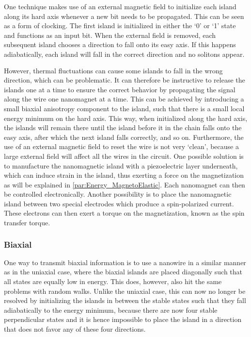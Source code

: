 \documentclass[12pt,a4paper]{article}
\begin{document}
One technique makes use of an external magnetic field to initialize each island along its hard axis whenever a new bit needs to be propagated. This can be seen as a form of clocking. The first island is initialized in either the `0' or `1' state and functions as an input bit. %
When the external field is removed, each subsequent island chooses a direction to fall onto its easy axis. If this happens adiabatically, each island will fall in the correct direction and no solitons appear.~\cite{NML_Carlton} \par
However, thermal fluctuations can cause some islands to fall in the wrong direction, which can be problematic. It can therefore be instructive to release the islands one at a time to ensure the correct behavior by propagating the signal along the wire one nanomagnet at a time. This can be achieved by introducing a small biaxial anisotropy component to the island, such that there is a small local energy minimum on the hard axis. This way, when initialized along the hard axis, the islands will remain there until the island before it in the chain falls onto the easy axis, after which the next island falls correctly, and so on. Furthermore, the use of an external magnetic field to reset the wire is not very `clean', because a large external field will affect all the wires in the circuit. One possible solution is to manufacture the nanomagnetic island with a piezoelectric layer underneath, which can induce strain in the island, thus exerting a force on the magnetization as will be explained in \cref{par:Energy_MagnetoElastic}. Each nanomagnet can then be controlled electronically. Another possibility is to place the nanomagnetic island between two special electrodes which produce a spin-polarized current. These electrons can then exert a torque on the magnetization, known as the spin transfer torque.~\cite{SwitchingForced_EnergyEfficient,syllabus_PoAEaPD}

\subsubsection{Biaxial}
One way to transmit biaxial information is to use a nanowire in a similar manner as in the uniaxial case, where the biaxial islands are placed diagonally such that all states are equally low in energy. %
This does, however, also hit the same problems with random walks. Unlike the uniaxial case, this can now no longer be resolved by initializing the islands in between the stable states such that they fall adiabatically to the energy minimum, because there are now four stable perpendicular states and it is hence impossible to place the island in a direction that does not favor any of these four directions.
\end{document}
